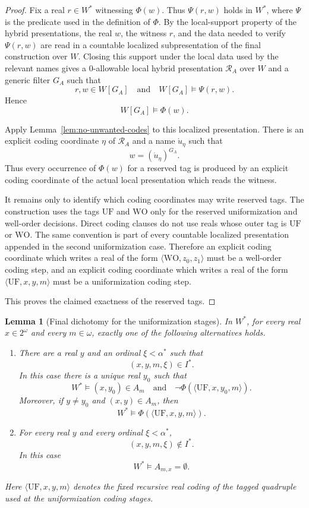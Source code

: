 \documentclass[a4paper,11pt]{article}
\newtheorem{lemma}[theorem]{Lemma}
\begin{document}
\begin{proof}
Fix a real \(r\in W^\ast\) witnessing \(\Phi(w)\).  Thus \(\Psi(r,w)\) holds in
\(W^\ast\), where \(\Psi\) is the predicate used in the definition of \(\Phi\).
By the local-support property of the hybrid presentations, the real \(w\), the
witness \(r\), and the data needed to verify \(\Psi(r,w)\) are read in a
countable localized subpresentation of the final construction over \(W\).  Closing
this support under the local data used by the relevant names gives a
\(0\)-allowable local hybrid presentation \(\mathcal R_A\) over \(W\) and a
generic filter \(G_A\) such that
\[
   r,w\in W[G_A]
   \quad\text{and}\quad
   W[G_A]\models\Psi(r,w).
\]
Hence
\[
   W[G_A]\models\Phi(w).
\]

Apply Lemma~\ref{lem:no-unwanted-codes} to this localized presentation.  There
is an explicit coding coordinate \(\eta\) of \(\mathcal R_A\) and a name
\(\dot u_\eta\) such that
\[
   w=(\dot u_\eta)^{G_A}.
\]
Thus every occurrence of \(\Phi(w)\) for a reserved tag is produced by an
explicit coding coordinate of the actual local presentation which reads the
witness.

It remains only to identify which coding coordinates may write reserved tags.
The construction uses the tags \(\mathrm{UF}\) and \(\mathrm{WO}\) only for the
reserved uniformization and well-order decisions.  Direct coding clauses do not
use reals whose outer tag is \(\mathrm{UF}\) or \(\mathrm{WO}\).  The same
convention is part of every countable localized presentation appended in the
second uniformization case.  Therefore an explicit coding coordinate which writes
a real of the form \(\langle\mathrm{WO},z_0,z_1\rangle\) must be a well-order
coding step, and an explicit coding coordinate which writes a real of the form
\(\langle\mathrm{UF},x,y,m\rangle\) must be a uniformization coding step.

This proves the claimed exactness of the reserved tags.
\end{proof}

\begin{lemma}[Final dichotomy for the uniformization stages]\label{lem:final-dichotomy-local}
In \(W^\ast\), for every real \(x\in 2^\omega\) and every \(m\in\omega\), exactly one of the following alternatives holds.
\begin{enumerate}
\item There are a real \(y\) and an ordinal \(\xi<\alpha^\ast\) such that
\[
   (x,y,m,\xi)\in I^\ast.
\]
In this case there is a unique real \(y_0\) such that
\[
   W^\ast\models
   (x,y_0)\in A_m
   \quad\text{and}\quad
   \neg\Phi(\langle\mathrm{UF},x,y_0,m\rangle).
\]
Moreover, if \(y\ne y_0\) and \((x,y)\in A_m\), then
\[
   W^\ast\models \Phi(\langle\mathrm{UF},x,y,m\rangle).
\]

\item For every real \(y\) and every ordinal \(\xi<\alpha^\ast\),
\[
   (x,y,m,\xi)\notin I^\ast.
\]
In this case
\[
   W^\ast\models A_{m,x}=\emptyset.
\]
\end{enumerate}
Here \(\langle\mathrm{UF},x,y,m\rangle\) denotes the fixed recursive real coding of the tagged quadruple used at the uniformization coding stages.
\end{lemma}
\end{document}
